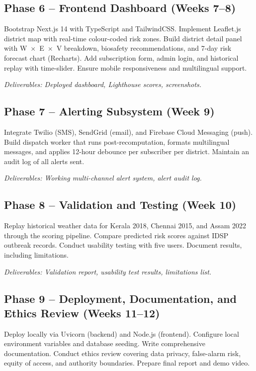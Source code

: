 \documentclass[12pt,a4paper]{report}
\begin{document}
\subsection{Phase 6 -- Frontend Dashboard (Weeks 7--8)}
Bootstrap Next.js 14 with TypeScript and TailwindCSS. Implement Leaflet.js district map with real-time colour-coded risk zones. Build district detail panel with W~$\times$~E~$\times$~V breakdown, biosafety recommendations, and 7-day risk forecast chart (Recharts). Add subscription form, admin login, and historical replay with time-slider. Ensure mobile responsiveness and multilingual support.

\textit{Deliverables: Deployed dashboard, Lighthouse scores, screenshots.}

\subsection{Phase 7 -- Alerting Subsystem (Week 9)}
Integrate Twilio (SMS), SendGrid (email), and Firebase Cloud Messaging (push). Build dispatch worker that runs post-recomputation, formats multilingual messages, and applies 12-hour debounce per subscriber per district. Maintain an audit log of all alerts sent.

\textit{Deliverables: Working multi-channel alert system, alert audit log.}

\subsection{Phase 8 -- Validation and Testing (Week 10)}
Replay historical weather data for Kerala 2018, Chennai 2015, and Assam 2022 through the scoring pipeline. Compare predicted risk scores against IDSP outbreak records. Conduct usability testing with five users. Document results, including limitations.

\textit{Deliverables: Validation report, usability test results, limitations list.}

\subsection{Phase 9 -- Deployment, Documentation, and Ethics Review (Weeks 11--12)}
Deploy locally via Uvicorn (backend) and Node.js (frontend). Configure local environment variables and database seeding. Write comprehensive documentation. Conduct ethics review covering data privacy, false-alarm risk, equity of access, and authority boundaries. Prepare final report and demo video.
\end{document}
